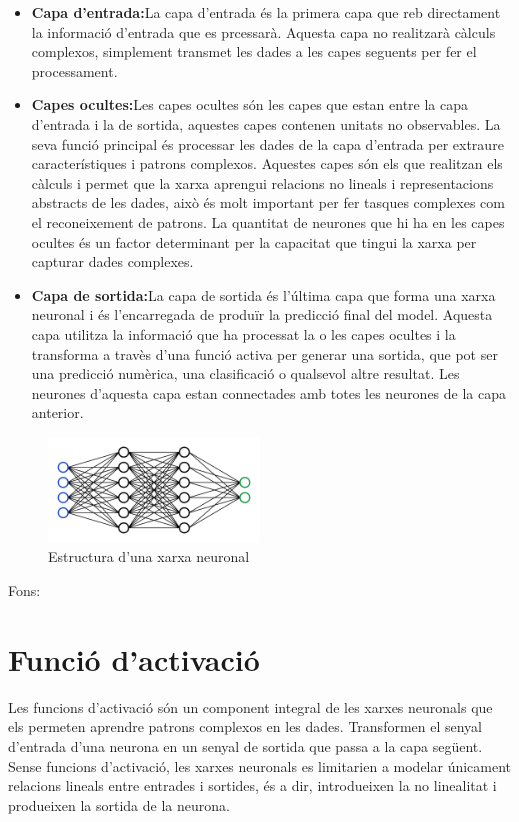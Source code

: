 \begin{itemize}
 \item \textbf{Capa d'entrada:}La capa d'entrada és la primera capa que reb directament la informació d'entrada que es prcessarà. Aquesta capa no realitzarà càlculs complexos, simplement transmet les dades a les capes seguents per fer el processament.
 \item \textbf{Capes ocultes:}Les capes ocultes són les capes que estan entre la capa d'entrada i la de sortida, aquestes capes contenen unitats no observables. La seva funció principal és processar les dades de la capa d'entrada per extraure característiques i patrons complexos. Aquestes capes són els que realitzan els càlculs i permet que la xarxa aprengui relacions no lineals i representacions abstracts de les dades, això és molt important per fer tasques complexes com el reconeixement de patrons. La quantitat de neurones que hi ha en les capes ocultes és un factor determinant per la capacitat que tingui la xarxa per capturar dades complexes.
 \item \textbf{Capa de sortida:}La capa de sortida és l'última capa que forma una xarxa neuronal i és l'encarregada de produïr la predicció final del model. Aquesta capa utilitza la informació que ha processat la o les capes ocultes i la transforma a travès d'una funció activa per generar una sortida, que pot ser una predicció numèrica, una clasificació o qualsevol altre resultat. Les neurones d'aquesta capa estan connectades amb totes les neurones de la capa anterior.
 \end{itemize}


\begin{figure}[h!]
    \centering
    \includegraphics[width=0.5\textwidth]{./figures/xarxa.png}
    \caption{Estructura d'una xarxa neuronal}
\end{figure}

Fons:~\cite{Hidden_layer} ~\cite{linkedin}

\section{
Funció d'activació}\label{Activació}
Les funcions d'activació són un component integral de les xarxes neuronals que els permeten aprendre patrons complexos en les dades. Transformen el senyal d'entrada d'una neurona en un senyal de sortida que passa a la capa següent. Sense funcions d'activació, les xarxes neuronals es limitarien a modelar únicament relacions lineals entre entrades i sortides, és a dir, introdueixen la no linealitat i produeixen la sortida de la neurona.

